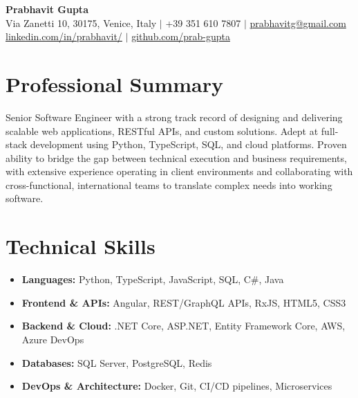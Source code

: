 \documentclass[11pt,a4paper]{article}
\begin{document}
\begin{center}
    {\Huge \textbf{Prabhavit Gupta}} \\
    \vspace{2mm}
    Via Zanetti 10, 30175, Venice, Italy $\vert$ +39 351 610 7807 $\vert$ \href{mailto:prabhavitg@gmail.com}{prabhavitg@gmail.com} \\
    \href{https://www.linkedin.com/in/prabhavit/}{linkedin.com/in/prabhavit/} $\vert$ \href{https://github.com/prab-gupta}{github.com/prab-gupta}
\end{center}

\vspace{5mm}
\section*{Professional Summary}
Senior Software Engineer with a strong track record of designing and delivering scalable web applications, RESTful APIs, and custom solutions. Adept at full-stack development using Python, TypeScript, SQL, and cloud platforms. Proven ability to bridge the gap between technical execution and business requirements, with extensive experience operating in client environments and collaborating with cross-functional, international teams to translate complex needs into working software.

\section*{Technical Skills}
\begin{itemize}[leftmargin=*]
    \item \textbf{Languages:} Python, TypeScript, JavaScript, SQL, C\#, Java
    \item \textbf{Frontend \& APIs:} Angular, REST/GraphQL APIs, RxJS, HTML5, CSS3
    \item \textbf{Backend \& Cloud:} .NET Core, ASP.NET, Entity Framework Core, AWS, Azure DevOps
    \item \textbf{Databases:} SQL Server, PostgreSQL, Redis
    \item \textbf{DevOps \& Architecture:} Docker, Git, CI/CD pipelines, Microservices
\end{itemize}
\end{document}
